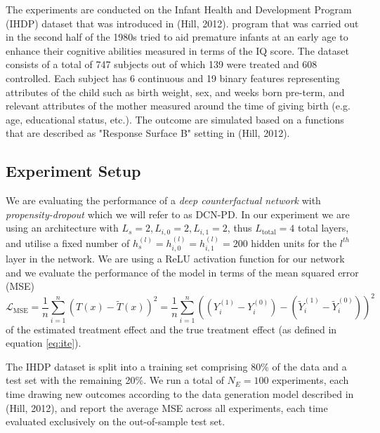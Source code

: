The experiments are conducted on the Infant Health and Development Program (IHDP) dataset that was introduced in (Hill, 2012). %
 program that was carried out in the second half of the 1980s tried to aid premature infants at an early age to enhance their cognitive abilities measured in terms of the IQ score. The dataset consists of a total of 747 subjects out of which 139 were treated and 608 controlled. Each subject has 6 continuous and 19 binary features representing attributes of the child such as birth weight, sex, and weeks born pre-term, and relevant attributes of the mother measured around the time of giving birth (e.g. age, educational status, etc.). The outcome are simulated based on a functions that are described as "Response Surface B" setting in (Hill, 2012). %
 
 

\subsection{Experiment Setup}
We are evaluating the performance of a \emph{deep counterfactual network} with \emph{propensity-dropout} which we will refer to as DCN-PD. In our experiment we are using an architecture with $L_s = 2, L_{i,0} =2 , L_{i,1} = 2$, thus $L_{\text{total}} = 4$ total layers, %
and utilise a fixed number of $h_s^{(l)} = h_{i,0}^{(l)} = h_{i,1}^{(l)} = 200$ hidden units for the $l^{th}$ layer in the network. We are using a ReLU activation function for our network and we evaluate the performance of the model in terms of the mean squared error (MSE)
\begin{equation} 
	\mathcal{L}_\text{MSE} = \frac{1}{n}\sum_{i=1}^{n} (T(x) - \tilde{T}(x))^2 = \frac{1}{n}\sum_{i=1}^{n} ((Y_i^{(1)} - Y_i^{(0)}) - (\tilde{Y}_i^{(1)} - \tilde{Y}_i^{(0)}))^2
\end{equation}
 of the estimated treatment effect and the true treatment effect (as defined in equation \ref{eq:ite}).  

The IHDP dataset is split into a training set comprising 80\% of the data and a test set with the remaining 20\%. We run a total of $N_E = 100$ experiments, each time drawing new outcomes according to the data generation model described in (Hill, 2012), %
and report the average MSE across all experiments, each time evaluated exclusively on the out-of-sample test set. 

